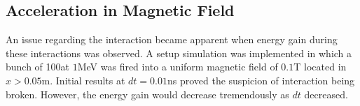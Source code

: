 \documentclass[a4paper,oneside,12pt]{report}
\numberwithin{equation}{chapter}
\begin{document}
\subsection{Acceleration in Magnetic Field}
An issue regarding the \eB interaction became apparent when energy gain during these interactions was observed.
A setup simulation was implemented in which a bunch of 100\e at $1$MeV was fired into a uniform magnetic field of $0.1$T located in $x>0.05$m.
Initial results at $dt=0.01$ns proved the suspicion of \eB interaction being broken. However, the energy gain would decrease tremendously as $dt$ decreased.

\end{document}
